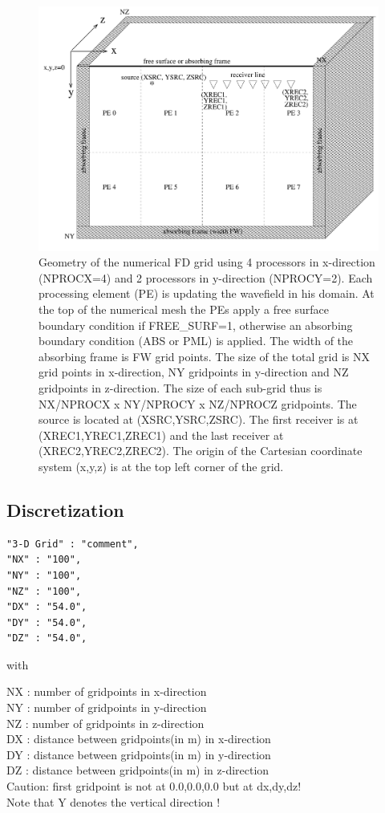 \documentclass{hitec}
\begin{document}
\begin{figure}
\begin{center}
\includegraphics[width=\textwidth,angle=0]{eps/grid.pdf}
\end{center}
\caption{Geometry of the numerical FD grid using 4 processors in x-direction (NPROCX=4) and 2 processors in y-direction (NPROCY=2). Each processing element (PE) is updating the wavefield in his domain.
At the top of the numerical mesh the PEs apply a free surface boundary condition if FREE\_SURF=1, otherwise an absorbing boundary condition (ABS or PML) is applied. The width of the absorbing frame is FW grid points.  The size of the total grid is NX grid points in x-direction, NY gridpoints in y-direction and NZ gridpoints in z-direction. The size of each sub-grid  thus is NX/NPROCX x NY/NPROCY x NZ/NPROCZ gridpoints. The source is located at (XSRC,YSRC,ZSRC). The first receiver is at (XREC1,YREC1,ZREC1) and the  last receiver at (XREC2,YREC2,ZREC2). The origin of the Cartesian coordinate system (x,y,z) is at the top left corner of the grid. }
\label{fig_grid}
\end{figure}
\subsection{Discretization}
\begin{verbatim}
"3-D Grid" : "comment",
"NX" : "100",
"NY" : "100",
"NZ" : "100",
"DX" : "54.0",
"DY" : "54.0",
"DZ" : "54.0",
\end{verbatim}

with

NX : number of gridpoints in x-direction\\
NY : number of gridpoints in y-direction\\
NZ : number of gridpoints in z-direction\\
DX : distance between gridpoints(in m) in x-direction\\
DY : distance between gridpoints(in m) in y-direction\\
DZ : distance between gridpoints(in m) in z-direction\\
Caution: first gridpoint is not at {0.0,0.0,0.0} but at {dx,dy,dz}!\\
Note that Y denotes the vertical direction !\\
\end{document}
